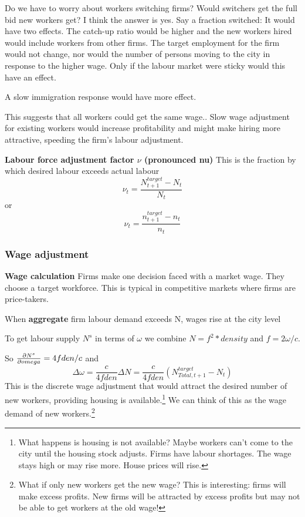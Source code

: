 Do we have to worry about workers switching firms? Would switchers get the full bid new workers get? I think the answer is yes. Say a fraction switched: It would have two effects. The catch-up ratio would be higher and the new workers hired would include workers from other firms. The target employment for the firm would not change, nor would the number of persons moving to the city in response to the higher wage. Only if the labour market were sticky would this have an effect.

A slow immigration response would have more effect.

This suggests that all workers could get the same wage.. Slow wage adjustment for existing workers would increase profitability and might make hiring more attractive, speeding the firm's labour adjustment.


\textbf{Labour force  adjustment factor $\nu$ (pronounced nu)} This is the fraction by which desired labour exceeds actual labour
\[\nu_t =\frac{N^{target}_{t+1}-N_{t}}{N_{t}}\]
or 
\[\nu_t =\frac{n^{target}_{t+1}-n_{t}}{n_{t}}\]



\subsubsection{Wage adjustment} 

\textbf{Wage calculation}
Firms make one decision faced with a market wage. They choose a target workforce. This is typical in \glspl{competitive market} where firms are price-takers. 


When \textbf{aggregate} firm labour demand exceeds N, wages rise at the city level

To get labour supply $N^s$ in terms of  $\omega$ we combine $N=f^2 *density$ and $f=2\omega/c$. 

So $\frac{\partial N^s}{\partial omega}=4fden/c$ and \[\Delta \omega=  \frac{c}{4fden}\Delta N = \frac{c}{4fden}(N_{Total,t+1}^{target}-N_t)\]
This is the discrete wage adjustment that would attract the desired number of new workers, providing housing is available.\footnote{What happens is housing is not available? Maybe workers can't come to the city until the housing stock adjusts. Firms have labour shortages.  The wage stays high or may rise more. House prices will rise.} We can think of this as the wage demand of new workers.\footnote{What if only new workers get the new wage? This is interesting: firms will make excess profits. New firms will be attracted by excess profits but may not be able to get workers at the old wage!}

